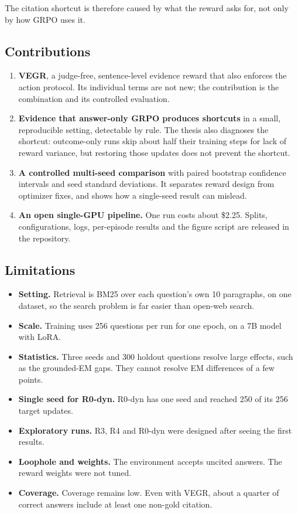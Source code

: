 The citation shortcut is therefore caused by what the reward asks for,
not only by how GRPO uses it.

\subsection{Contributions}\label{sec:5.2}

\begin{enumerate}
\def\labelenumi{\arabic{enumi}.}
\tightlist
\item
  \textbf{VEGR}, a judge-free, sentence-level evidence reward that also
  enforces the action protocol. Its individual terms are not new; the
  contribution is the combination and its controlled evaluation.
\item
  \textbf{Evidence that answer-only GRPO produces shortcuts} in a small,
  reproducible setting, detectable by rule. The thesis also diagnoses
  the shortcut: outcome-only runs skip about half their training steps
  for lack of reward variance, but restoring those updates does not
  prevent the shortcut.
\item
  \textbf{A controlled multi-seed comparison} with paired bootstrap
  confidence intervals and seed standard deviations. It separates reward
  design from optimizer fixes, and shows how a single-seed result can
  mislead.
\item
  \textbf{An open single-GPU pipeline.} One run costs about \$2.25.
  Splits, configurations, logs, per-episode results and the figure
  script are released in the repository.
\end{enumerate}

\subsection{Limitations}\label{sec:5.3}

\begin{itemize}
\tightlist
\item
  \textbf{Setting.} Retrieval is BM25 over each question's own 10
  paragraphs, on one dataset, so the search problem is far easier than
  open-web search.
\item
  \textbf{Scale.} Training uses 256 questions per run for one epoch, on
  a 7B model with LoRA.
\item
  \textbf{Statistics.} Three seeds and 300 holdout questions resolve
  large effects, such as the grounded-EM gaps. They cannot resolve EM
  differences of a few points.
\item
  \textbf{Single seed for R0-dyn.} R0-dyn has one seed and reached 250
  of its 256 target updates.
\item
  \textbf{Exploratory runs.} R3, R4 and R0-dyn were designed after
  seeing the first results.
\item
  \textbf{Loophole and weights.} The environment accepts uncited
  answers. The reward weights were not tuned.
\item
  \textbf{Coverage.} Coverage remains low. Even with VEGR, about a
  quarter of correct answers include at least one non-gold citation.
\end{itemize}

